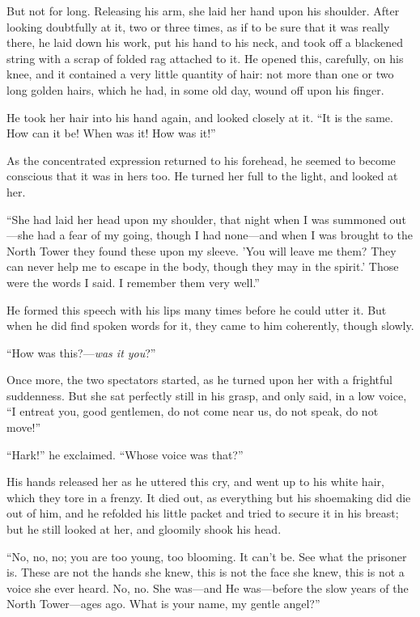 But not for long.  Releasing his arm, she laid her hand upon his
shoulder.  After looking doubtfully at it, two or three times, as if
to be sure that it was really there, he laid down his work, put his
hand to his neck, and took off a blackened string with a scrap of
folded rag attached to it.  He opened this, carefully, on his knee,
and it contained a very little quantity of hair:  not more than one or
two long golden hairs, which he had, in some old day, wound off upon
his finger.

He took her hair into his hand again, and looked closely at it.  ``It
is the same.  How can it be!  When was it!  How was it!''

As the concentrated expression returned to his forehead, he seemed to
become conscious that it was in hers too.  He turned her full to the
light, and looked at her.

``She had laid her head upon my shoulder, that night when I was
summoned out---she had a fear of my going, though I had none---and when
I was brought to the North Tower they found these upon my sleeve.
'You will leave me them?  They can never help me to escape in the
body, though they may in the spirit.' Those were the words I said.
I remember them very well.''

He formed this speech with his lips many times before he could utter
it. But when he did find spoken words for it, they came to him
coherently, though slowly.

``How was this?---\emph{was it you}?''

Once more, the two spectators started, as he turned upon her with a
frightful suddenness.  But she sat perfectly still in his grasp, and
only said, in a low voice, ``I entreat you, good gentlemen, do not
come near us, do not speak, do not move!''

``Hark!'' he exclaimed.  ``Whose voice was that?''

His hands released her as he uttered this cry, and went up to his
white hair, which they tore in a frenzy.  It died out, as everything
but his shoemaking did die out of him, and he refolded his little
packet and tried to secure it in his breast; but he still looked at
her, and gloomily shook his head.

``No, no, no; you are too young, too blooming.  It can't be.  See what
the prisoner is.  These are not the hands she knew, this is not the
face she knew, this is not a voice she ever heard.  No, no.  She
was---and He was---before the slow years of the North Tower---ages ago.
What is your name, my gentle angel?''

